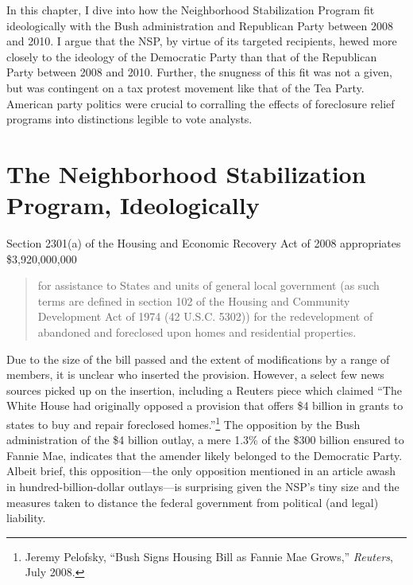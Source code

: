 \documentclass[12pt,oneside]{psthesis}
\begin{document}
In this chapter, I dive into how the Neighborhood Stabilization Program fit ideologically with the Bush administration and Republican Party between 2008 and 2010.
I argue that the NSP, by virtue of its targeted recipients, hewed more closely to the ideology of the Democratic Party than that of the Republican Party between 2008 and 2010.
Further, the snugness of this fit was not a given, but was contingent on a tax protest movement like that of the Tea Party.
American party politics were crucial to corralling the effects of foreclosure relief programs into distinctions legible to vote analysts.

\hypertarget{the-neighborhood-stabilization-program-ideologically}{%
\section{The Neighborhood Stabilization Program, Ideologically}\label{the-neighborhood-stabilization-program-ideologically}}

Section 2301(a) of the Housing and Economic Recovery Act of 2008 appropriates \$3,920,000,000
\begin{quote}
for assistance to States and units of general local government (as such terms are defined in section 102 of the Housing and Community Development Act of 1974 (42 U.S.C. 5302)) for the redevelopment of abandoned and foreclosed upon homes and residential properties.
\end{quote}
Due to the size of the bill passed and the extent of modifications by a range of members, it is unclear who inserted the provision.
However, a select few news sources picked up on the insertion, including a Reuters piece which claimed ``The White House had originally opposed a provision that offers \$4 billion in grants to states to buy and repair foreclosed homes.''\footnote{Jeremy Pelofsky, ``Bush Signs Housing Bill as Fannie Mae Grows,'' \emph{Reuters}, July 2008.}
The opposition by the Bush administration of the \$4 billion outlay, a mere 1.3\% of the \$300 billion ensured to Fannie Mae, indicates that the amender likely belonged to the Democratic Party.
Albeit brief, this opposition---the only opposition mentioned in an article awash in hundred-billion-dollar outlays---is surprising given the NSP's tiny size and the measures taken to distance the federal government from political (and legal) liability.
\end{document}
